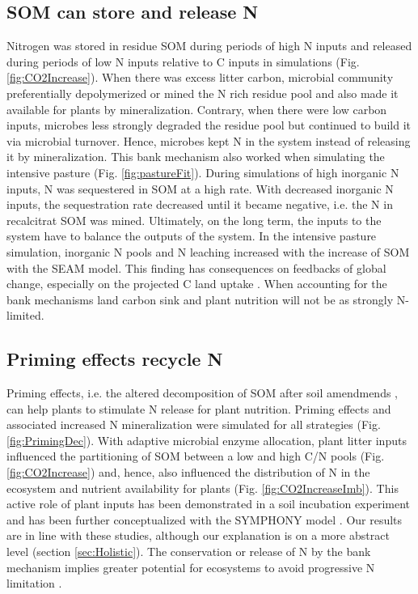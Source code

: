 \subsection{SOM can store and release N}
Nitrogen was stored in residue SOM during periods of high N inputs and
released during periods of low N inputs relative to C inputs in simulations
(Fig.
\ref{fig:CO2Increase}). When there was excess litter carbon, microbial community
preferentially depolymerized or mined the N rich residue pool and also
made it available for plants by mineralization.
Contrary, when there were low carbon inputs, microbes less strongly degraded the
residue pool but continued to build it via microbial turnover.
Hence, microbes kept N in the system instead of releasing it by mineralization.
This bank mechanism \citep{Perveen14} also worked when simulating the intensive
pasture (Fig. \ref{fig:pastureFit}). During simulations of high inorganic N
inputs, N was sequestered in SOM at a high rate. With decreased inorganic N
inputs, the sequestration rate decreased until it became negative, i.e. the N
in recalcitrat SOM was mined. Ultimately, on the long term, the inputs to the
system have to balance the outputs of the system. In the intensive pasture simulation,
inorganic N pools and N leaching increased with the increase of SOM with the
SEAM model. This finding has consequences on feedbacks of global change, especially
on the projected C land uptake \citep{Friedlingstein14}. When accounting for the
bank mechanisms land carbon sink and plant nutrition will not be as strongly
N-limited.

\subsection{Priming effects recycle N}
Priming effects, i.e. the altered decomposition of SOM after soil amendmends
\citep{Kuzyakov00}, can help plants to stimulate N release for plant nutrition.
Priming effects and associated increased N mineralization were simulated for all
strategies (Fig. \ref{fig:PrimingDec}). With adaptive microbial enzyme
allocation, plant litter inputs influenced the partitioning of SOM between a low
and high C/N pools (Fig. \ref{fig:CO2Increase}) and, hence,
also influenced the distribution of N in the ecosystem and nutrient
availability for plants (Fig. \ref{fig:CO2IncreaseImb}). This active role of
plant inputs has been demonstrated in a soil incubation experiment
\citep{Fontaine11} and has been further conceptualized with the SYMPHONY model
\citep{Perveen14}. Our results are in line with these studies, although our
explanation is on a more abstract level (section \ref{sec:Holistic}). The
conservation or release of N by the bank mechanism implies greater potential
for ecosystems to avoid progressive N limitation \citep{Norby10, Franklin14, Averill15}.

